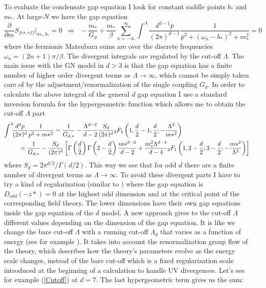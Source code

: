 \documentclass[twoside]{article}
\begin{document}
 To evaluate the condensate gap equation I look for constant saddle points $b_*$ and $m_*$. At large-$N$ we have the gap equation
 \begin{equation}
 	\frac{\partial}{\partial m}S_{fer,eff}\Biggl|_{m_*,b_*}\!\!\!\!=0\,\,\,\Rightarrow\,\,\, -\frac{m_*}{G_d}+\frac{m_*}{\beta}\sum_{n=-\infty}^\infty\int^\Lambda\!\!\frac{d^{d-1} \bar{p}}{(2\pi)^{d-1}}\frac{1}{\bar{p}^2+(\omega_n-b_*)^2+m_*^2}=0
 \end{equation}
 where  the fermionic Matsubara sums are over the discrete frequencies $\omega_n=(2n+1)\pi/\beta$. The divergent integrals are regulated by the cut-off $\Lambda$. 
 The main issue with the GN model in $d>3$ is that the gap equation has  a finite number of higher order divergent terms as $\Lambda\rightarrow\infty$, which cannot be simply taken care of by the adjustment/renormalization of the single coupling $G_d$. In order to calculate the above integral of the general $d$ gap equation I use a standard inversion formula for the hypergeometric function which allows me to obtain the cut-off $\Lambda$ part 
\begin{align}
\label{Cutoff}
\int^\Lambda\!\!\!\frac{d^d p}{(2\pi)^d}\frac{1}{p^2+m*^2} &= \frac{1}{G_{d,*}}-\frac{\Lambda^{d-2}}{d-2}\frac{S_d}{(2\pi)^d}{}_2F_1\left(1,\frac{d}{2}-1;\frac{d}{2};-\frac{\Lambda^2}{m*^2}\right)\nonumber\\
&\hspace{-2cm}=\frac{1}{G_{d,*}}-\frac{S_d}{(2\pi)^d}\left[\Gamma\left(\frac{d}{2}\right)\Gamma\left(2-\frac{d}{2}\right)\frac{m*^{d-2}}{d-2}+\frac{m^2_*\Lambda^{d-4}}{d-4}{}_2F_1\left(1,2-\frac{d}{2};3-\frac{d}{2};-\frac{m*^2}{\Lambda^2}\right)\right]
\end{align}
where $S_d=2\pi^{d/2}/\Gamma(d/2)$. This way we  see that for odd $d$ there are a finite number of divergent terms as $\Lambda\rightarrow\infty$. To avoid these divergent parts I have to try a kind of regularization (similar to \cite{Filothodoros Lattices}) where the gap equation is $D_{odd}(-z*)=0$ at the highest odd dimension and at the critical point of the corresponding field theory. The lower dimensions have their own gap equations inside the gap equation of the $d$ model. A new approach gives to the cut-off $\Lambda$ different values depending on the dimension of the gap equation. It is like we change the bare cut-off $\Lambda$ with a running cut-off $\Lambda_d$ that varies as a function of energy (see for example \cite{ Epelbaum, Barlas, Tao}). It takes into account the renormalization group flow of the theory, which describes how the theory's parameters evolve as the energy scale changes, instead of the bare cut-off which is a fixed regularization scale introduced at the beginning of a calculation to handle UV divergences. Let's see for example ({\ref{Cutoff}}) at $d=7$. The last hypergeometric term gives us the sum:
\end{document}
